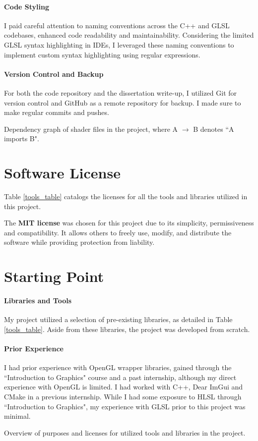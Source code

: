 \paragraph{Code Styling}
I paid careful attention to naming conventions across the C++ and GLSL codebases, enhanced code readability and maintainability. Considering the limited GLSL syntax highlighting in IDEs, I leveraged these naming conventions to implement custom syntax highlighting using regular expressions.

\paragraph{Version Control and Backup}
For both the code repository and the dissertation write-up, I utilized Git for version control and GitHub as a remote repository for backup. I made sure to make regular commits and pushes.

{Dependency graph of shader files in the project, where A $\rightarrow$ B denotes ``A imports B".}

\section{Software License}
\label{sec:License}

Table \ref{tools_table} catalogs the licenses for all the tools and libraries utilized in this project.

The \textbf{MIT license} was chosen for this project due to its simplicity, permissiveness and compatibility. It allows others to freely use, modify, and distribute the software while providing protection from liability.


\section{Starting Point}
\label{sec:Starting Point}

\paragraph{Libraries and Tools}
My project utilized a selection of pre-existing libraries, as detailed in Table \ref{tools_table}. Aside from these libraries, the project was developed from scratch. 

\paragraph{Prior Experience}
I had prior experience with OpenGL wrapper libraries, gained through the ``Introduction to Graphics" course and a past internship, although my direct experience with OpenGL is limited. I had worked with C++, Dear ImGui and CMake in a previous internship. While I had some exposure to HLSL through ``Introduction to Graphics", my experience with GLSL prior to this project was minimal.

{Overview of purposes and licenses for utilized tools and libraries in the project.}